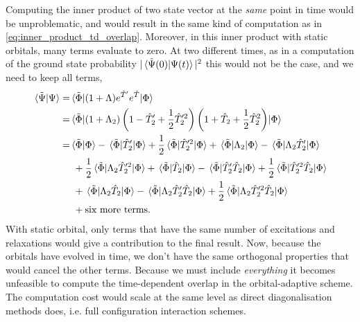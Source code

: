     Computing the inner product of two state vector at the \emph{same} point in 
    time would be unproblematic, and would result in the same kind of 
    computation as in \autoref{eq:inner_product_td_overlap}. Moreover, in this 
    inner product with static orbitals, many terms evaluate to zero. At two different 
    times, as in a computation of the ground state probability
    $|\braket*{\tilde{\Psi}(0)}{\Psi(t)}|^2$ this would not be the case, and we need 
    to keep all terms,
    \begin{equation}
        \begin{aligned}
        \braket*{\tilde{\Psi}}{\Psi}
            =& \mel*{\tilde{\Phi}}{(1 + \Lambda) e^{\hat{T}'}e^{\hat{T}}}{\Phi} \\
            =& \mel*{\tilde{\Phi}}
            {
               \left(1 + \Lambda_2\right)
               \left(1 - \hat{T}'_2 + \frac{1}{2}\hat{T}'^2_2\right) 
               \left(1 + \hat{T}_2 + \frac{1}{2}\hat{T}^2_2\right)
            }
            {\Phi} \\
            =& \braket*{\tilde{\Phi}}{\Phi} - \mel*{\tilde{\Phi}}{\hat{T}'_2}{\Phi} 
                + \frac{1}{2}\mel*{\tilde{\Phi}}{\hat{T}'^2_2}{\Phi}
                + \mel*{\tilde{\Phi}}{\Lambda_2}{\Phi}
                - \mel*{\tilde{\Phi}}{\Lambda_2\hat{T}'_2}{\Phi} \\
            &\ + \frac{1}{2} \mel*{\tilde{\Phi}}{\Lambda_2\hat{T}'^2_2}{\Phi}
                + \mel*{\tilde{\Phi}}{\hat{T}_2}{\Phi}
                - \mel*{\tilde{\Phi}}{\hat{T}'_2\hat{T}_2}{\Phi}
                + \frac{1}{2}\mel*{\tilde{\Phi}}{\hat{T}'^2_2\hat{T}_2}{\Phi} \\
            &\  + \mel*{\tilde{\Phi}}{\Lambda_2\hat{T}_2}{\Phi}
                - \mel*{\tilde{\Phi}}{\Lambda_2\hat{T}'_2\hat{T}_2}{\Phi}
                + \frac{1}{2}\mel*{\tilde{\Phi}}{\Lambda_2\hat{T}'^2_2\hat{T}_2}{\Phi} \\
            &\ + \text{six more terms}.
        \end{aligned}
    \end{equation}
    With static orbital, only terms that have the same number of excitations and relaxations would 
    give a contribution to the final result. Now, because the orbitals have evolved in time, 
    we don't have the same orthogonal properties that would cancel the other terms. Because we must 
    include \emph{everything} it becomes unfeasible to compute the time-dependent overlap in the 
    orbital-adaptive scheme. The computation cost would scale at the same level as direct diagonalisation 
    methods does, i.e. full configuration interaction schemes.

